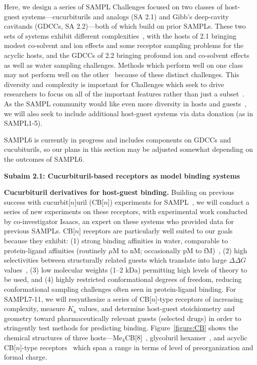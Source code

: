 \documentclass[11pt]{article}
\begin{document}
Here, we design a series of SAMPL Challenges focused on two classes of host-guest systems---cucurbiturils and analogs (SA 2.1) and Gibb's deep-cavity cavitands (GDCCs, SA 2.2)---both of which build on prior SAMPLs.
These two sets of systems exhibit different complexities~\cite{Mobley:2017:AnnualReviewofBiophysics}, with the hosts of 2.1 bringing modest co-solvent and ion effects and some receptor sampling problems for the acyclic hosts, and the GDCCs of 2.2 bringing profound ion and co-solvent effects as well as water sampling challenges.
Methods which perform well on one class may not perform well on the other~\cite{Mobley:2017:AnnualReviewofBiophysics} because of these distinct challenges.
This diversity and complexity is important for Challenges which seek to drive researchers to focus on all of the important features rather than just a subset~\cite{Saez-Rodriguez:2016:NatRevGenet}.
As the SAMPL community would like even more diversity in hosts and guests~\cite{Mobley:2017:eScholarship}, we will also seek to include additional host-guest systems via data donation (as in SAMPL1-5).

SAMPL6 is currently in progress and includes components on GDCCs and cucubiturils, so our plans in this section may be adjusted somewhat depending on the outcomes of SAMPL6.

\textbf{Subaim 2.1: Cucurbituril-based receptors as model binding systems}

\textbf{Cucurbituril derivatives for host-guest binding.} 
Building on previous success with cucurbit[$n$]uril (CB[$n$]) experiments for SAMPL~\cite{ma_acyclic_2012-2, cao_absolute_2014, she_glycoluril-derived_2016}, we will conduct a series of new experiments on these receptors,
with experimental work conducted by co-investigator Isaacs, an expert on these systems who provided data for previous SAMPLs.
CB[$n$] receptors are particularly well suited to our goals because they exhibit: (1) strong binding affinities in water, comparable to protein-ligand affinities (routinely $\mu$M to nM; occasionally pM to fM)~\cite{cao_attomolar_2014, liu_cucurbituril_2005, mock_structure_1986, assaf_cucurbiturils:_2015, moghaddam_new_2011, shetty_can_2015, biedermann_release_2012}, (2) high selectivities between structurally related guests which translate into large $\Delta \Delta G$ values~\cite{isaacs_stimuli_2014}, (3) low molecular weights (1--2 kDa) permitting high levels of theory to be used, and (4) highly restricted conformational degrees of freedom, reducing conformational sampling challenges often seen in protein-ligand binding.
For SAMPL7-11, we will resynthesize a series of CB[$n$]-type receptors of increasing complexity, measure $K_a$ values, and determine host-guest stoichiometry and geometry toward pharmaceutically relevant guests (selected drugs) in order to stringently test methods for predicting binding.  
Figure~\ref{figure:CB} shows the chemical structures of three hosts---Me$_4$CB[8]~\cite{vinciguerra_synthesis_2015}, glycoluril hexamer~\cite{lucas_templated_2011}, and acyclic CB[$n$]-type receptors~\cite{ma_acyclic_2012, ma_acyclic_2012-1, zhang_acyclic_2014, gilberg_acyclic_2015, sigwalt_acyclic_2016, zhang_acyclic_2014-1} which span a range in terms of level of preorganization and formal charge.
\end{document}
